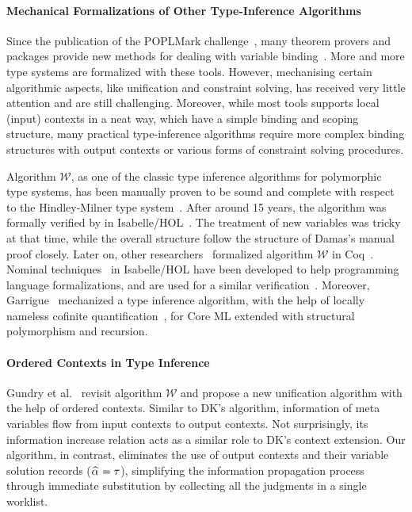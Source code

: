 \paragraph{Mechanical Formalizations of Other Type-Inference Algorithms}
Since the publication of the {\sc POPLMark} challenge~\cite{aydemir2005mechanized},
many theorem provers and packages provide new methods for dealing
with variable binding~\cite{aydemir2008engineering,urban2008nominalTech,chlipala2008parametric}.
More and more type systems are formalized with these tools.
However, mechanising certain algorithmic aspects, like unification and
constraint solving, has received very little attention and are still challenging.
Moreover, while most tools supports local (input) contexts in a neat way, which have a simple
binding and scoping structure, many practical type-inference algorithms require
more complex binding structures with output contexts or various forms of constraint solving procedures.

Algorithm $\mathcal{W}$,
as one of the classic type inference algorithms for polymorphic type systems,
has been manually proven to be sound and complete
with respect to the Hindley-Milner type system~\cite{}.
After around 15 years, the algorithm was formally verified by
\citet{naraschewski1999type} in Isabelle/HOL~\cite{nipkow2002isabelle}.
The treatment of new variables was tricky at that time, while the overall structure follow the
structure of Damas's manual proof closely.
Later on, other researchers~\cite{dubois2000proving,dubois1999certification}
formalized algorithm $\mathcal{W}$ in Coq~\cite{Coq}.
Nominal techniques~\cite{urban2008nominalTech} in Isabelle/HOL have been
developed to help programming language formalizations, and are used for a similar
verification~\cite{urban2008nominal}. Moreover, Garrigue~\cite{garrigue2015certified}
mechanized a type inference algorithm,
with the help of locally nameless cofinite quantification~\cite{},
for Core ML extended with structural polymorphism and recursion.

\paragraph{Ordered Contexts in Type Inference}
Gundry et al.~\cite{gundry2010type} revisit algorithm $\mathcal{W}$ and
propose a new unification algorithm with the help of ordered contexts.
Similar to DK's algorithm, information of meta variables flow from input contexts to output contexts.
Not surprisingly, its information increase relation acts as a similar role to DK's context extension.
Our algorithm, in contrast,
eliminates the use of output contexts and their variable solution records ($\al = \tau$),
simplifying the information propagation process through immediate substitution
by collecting all the judgments in a single worklist.

